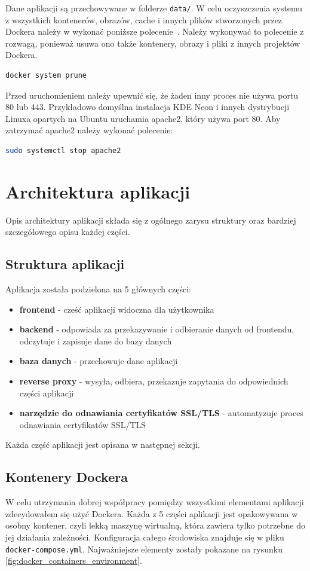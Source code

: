 \documentclass[shortabstract]{iithesis}
\begin{document}
Dane aplikacji są przechowywane w folderze \texttt{data/}.
W celu oczyszczenia systemu z wszystkich kontenerów, obrazów, cache i innych plików stworzonych przez Dockera należy w wykonać poniższe polecenie~\cite{DockerPrune}.
Należy wykonywać to polecenie z rozwagą, ponieważ usuwa ono także kontenery, obrazy i pliki z innych projektów Dockera.
\begin{lstlisting}[language=bash]
docker system prune
\end{lstlisting}
Przed uruchomieniem należy upewnić się, że żaden inny proces nie używa portu 80 lub 443.
Przykładowo domyślna instalacja KDE Neon i innych dystrybucji Linuxa opartych na Ubuntu uruchamia apache2, który używa port 80.
Aby zatrzymać apache2 należy wykonać polecenie:
\begin{lstlisting}[language=bash]
sudo systemctl stop apache2
\end{lstlisting}

\chapter{Architektura aplikacji}
Opis architektury aplikacji składa się z ogólnego zarysu struktury oraz bardziej szczegółowego opisu każdej części.
\section{Struktura aplikacji}
Aplikacja została podzielona na 5 głównych części:
\begin{itemize}
    \item \textbf{frontend} - cześć aplikacji widoczna dla użytkownika
    \item \textbf{backend} - odpowiada za przekazywanie i odbieranie danych od frontendu, odczytuje i zapisuje dane do bazy danych
    \item \textbf{baza danych} - przechowuje dane aplikacji
    \item \textbf{reverse proxy} - wysyła, odbiera, przekazuje zapytania do odpowiednich części aplikacji
    \item \textbf{narzędzie do odnawiania certyfikatów SSL/TLS} - automatyzuje proces odnawiania certyfikatów SSL/TLS
\end{itemize}
Każda część aplikacji jest opisana w następnej sekcji.

\section{Kontenery Dockera}
W celu utrzymania dobrej współpracy pomiędzy wszystkimi elementami aplikacji zdecydowałem się użyć Dockera\cite{Docker}.
Każda z 5 części aplikacji jest opakowywana w osobny kontener, czyli lekką maszynę wirtualną, która zawiera tylko potrzebne do jej działania zależności.
Konfiguracja całego środowiska znajduje się w pliku \texttt{docker-compose.yml}. Najważniejsze elementy zostały pokazane na rysunku \ref{fig:docker_containers_environment}.
\end{document}
